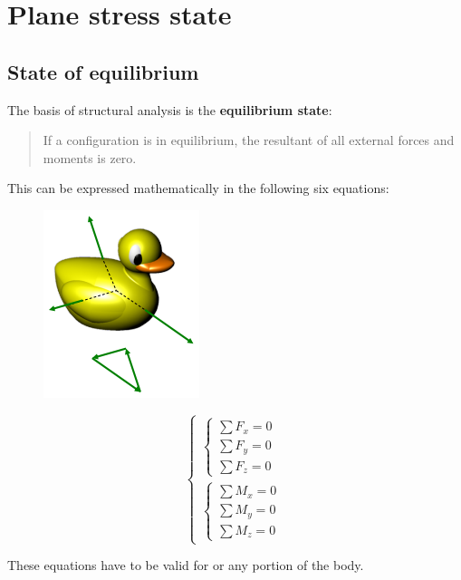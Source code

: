 \documentclass[class=report, crop=false, 12pt,a4paper]{standalone}
\begin{document}
\section{Plane stress state}
\subsection{State of equilibrium}
The basis of structural analysis is the \textbf{equilibrium state}:
\begin{quotation}
    If a configuration is in equilibrium, the resultant of all external forces and moments is zero.
\end{quotation}
This can be expressed mathematically in the following six equations:
\hfill \break
\begin{minipage}{0.5\textwidth}
    \begin{figure}[H]
        \centering
        \includegraphics[width = 0.5 \textwidth]{../img/diagram38.png}
        \caption{}
    \end{figure}    
\end{minipage}
\begin{minipage}{0.45\textwidth}
    \begin{equation}
        \begin{cases}
            \begin{cases}
                \sum F_x = 0\\
                \sum F_y = 0\\
                \sum F_z = 0
            \end{cases}\\
            \begin{cases}
                \sum M_x = 0\\
                \sum M_y = 0\\
                \sum M_z = 0
            \end{cases}
        \end{cases}
    \end{equation} 
\end{minipage}
\hfill \break
These equations have to be valid for or any portion of the body.
\end{document}
